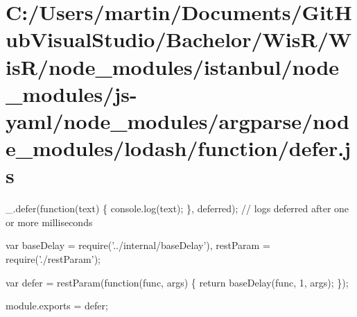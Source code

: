 \hypertarget{_c_1_2_users_2martin_2_documents_2_git_hub_visual_studio_2_bachelor_2_wis_r_2_wis_r_2node_module9e91ebb44c4243369c82e7fb9fa83046}{}\section{C\+:/\+Users/martin/\+Documents/\+Git\+Hub\+Visual\+Studio/\+Bachelor/\+Wis\+R/\+Wis\+R/node\+\_\+modules/istanbul/node\+\_\+modules/js-\/yaml/node\+\_\+modules/argparse/node\+\_\+modules/lodash/function/defer.\+js}
\+\_\+.\+defer(function(text) \{ console.\+log(text); \}, \textquotesingle{}deferred\textquotesingle{}); // logs \textquotesingle{}deferred\textquotesingle{} after one or more milliseconds


\begin{DoxyCodeInclude}
var baseDelay = require(\textcolor{stringliteral}{'../internal/baseDelay'}),
    restParam = require(\textcolor{stringliteral}{'./restParam'});

var defer = restParam(\textcolor{keyword}{function}(func, args) \{
  \textcolor{keywordflow}{return} baseDelay(func, 1, args);
\});

module.exports = defer;
\end{DoxyCodeInclude}
 